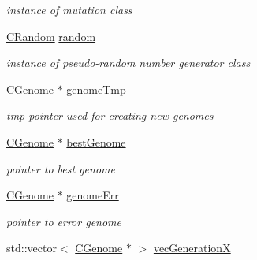 \begin{DoxyCompactItemize}
\begin{DoxyCompactList}\small\item\em instance of mutation class \item\end{DoxyCompactList}\item 
\hypertarget{classCGeneticAlgorithm_a642824db5c6141b2617bad71c62b4cb2}{
\hyperlink{classCRandom}{CRandom} \hyperlink{classCGeneticAlgorithm_a642824db5c6141b2617bad71c62b4cb2}{random}}
\label{classCGeneticAlgorithm_a642824db5c6141b2617bad71c62b4cb2}

\begin{DoxyCompactList}\small\item\em instance of pseudo-\/random number generator class \item\end{DoxyCompactList}\item 
\hypertarget{classCGeneticAlgorithm_a9d89011752d5b14444829c0c79089231}{
\hyperlink{classCGenome}{CGenome} $\ast$ \hyperlink{classCGeneticAlgorithm_a9d89011752d5b14444829c0c79089231}{genomeTmp}}
\label{classCGeneticAlgorithm_a9d89011752d5b14444829c0c79089231}

\begin{DoxyCompactList}\small\item\em tmp pointer used for creating new genomes \item\end{DoxyCompactList}\item 
\hypertarget{classCGeneticAlgorithm_a2824f10983a22a1c2a834120f7630594}{
\hyperlink{classCGenome}{CGenome} $\ast$ \hyperlink{classCGeneticAlgorithm_a2824f10983a22a1c2a834120f7630594}{bestGenome}}
\label{classCGeneticAlgorithm_a2824f10983a22a1c2a834120f7630594}

\begin{DoxyCompactList}\small\item\em pointer to best genome \item\end{DoxyCompactList}\item 
\hypertarget{classCGeneticAlgorithm_ac14e5b17ffe50ffcbfff89233b7c68d4}{
\hyperlink{classCGenome}{CGenome} $\ast$ \hyperlink{classCGeneticAlgorithm_ac14e5b17ffe50ffcbfff89233b7c68d4}{genomeErr}}
\label{classCGeneticAlgorithm_ac14e5b17ffe50ffcbfff89233b7c68d4}

\begin{DoxyCompactList}\small\item\em pointer to error genome \item\end{DoxyCompactList}\item 
\hypertarget{classCGeneticAlgorithm_aee066f02809d339e00de999880aeaf4a}{
std::vector$<$ \hyperlink{classCGenome}{CGenome} $\ast$ $>$ \hyperlink{classCGeneticAlgorithm_aee066f02809d339e00de999880aeaf4a}{vecGenerationX}}
\label{classCGeneticAlgorithm_aee066f02809d339e00de999880aeaf4a}


\end{DoxyCompactItemize}
